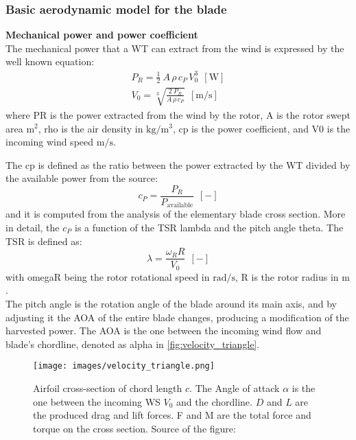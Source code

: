 \subsubsection{Basic aerodynamic model for the blade}\label{subsec:mech_pow_and_pow_coeff}
\textbf{Mechanical power and power coefficient}\\
The mechanical power that a \acrshort{WT} can extract from the wind is expressed by the well known equation:
\begin{gather}
    P_R = \frac{1}{2}\ A \, \rho \, c_P \, V_0^3 \ \ \left[\si{\watt}\right] \label{eq:power} \\
    V_0 = \sqrt[3]{\frac{2 \ P_R}{A \, \rho \, c_P}} \ \ \left[\si{\meter \per \second}\right] 
\end{gather}
where \acrshort{PR} is the power extracted from the wind by the rotor, \acrshort{A} is the rotor swept area $\si{\square \meter}$, \acrshort{rho} is the air density in $\si{\kilo\gram\per\cubic\meter}$, \acrshort{cp} is the power coefficient, and \acrshort{V0} is the incoming wind speed $\si{\meter\per\second}$.

The \acrfull{cp} is defined as the ratio between the power extracted by the \acrshort{WT} divided by the available power from the source:
\begin{equation}
    c_P = \frac{P_{R}}{P_{\text{available}}} \ \ \left[-\right]
    \label{eq:c_P}
\end{equation}
and it is computed from the analysis of the elementary blade cross section. More in detail, the $c_P$ is a function of the \acrfull{TSR} \acrshort{lambda} and the pitch angle \acrshort{theta}. The \acrshort{TSR} is defined as:
\begin{equation}
    \lambda = \frac{\omega_R R}{V_0} \ \ \left[-\right]
    \label{eq:TSR}
\end{equation}
with \acrshort{omegaR} being the rotor rotational speed in $\si{\radian \per \second}$, \acrshort{R} is the rotor radius in $\si{\meter}$.\\
The pitch angle is the rotation angle of the blade around its main axis, and by adjusting it the \acrfull{AOA} of the entire blade changes, producing a modification of the harvested power. The \acrshort{AOA} is the one between the incoming wind flow and blade's chordline, denoted as \acrshort{alpha} in \autoref{fig:velocity_triangle}. 
\begin{figure}[htb]
    \centering
    \texttt{[image: images/velocity\_triangle.png]}
    \caption{Airfoil cross-section of chord length $c$. The Angle of attack $\alpha$ is the one between the incoming \acrshort{WS} $V_0$ and the chordline. $D$ and $L$ are the produced drag and lift forces. F and M are the total force and torque on the cross section. Source of the figure: \cite{Aerodynamics_of_wind_turbines}}
    \label{fig:velocity_triangle}
\end{figure}

